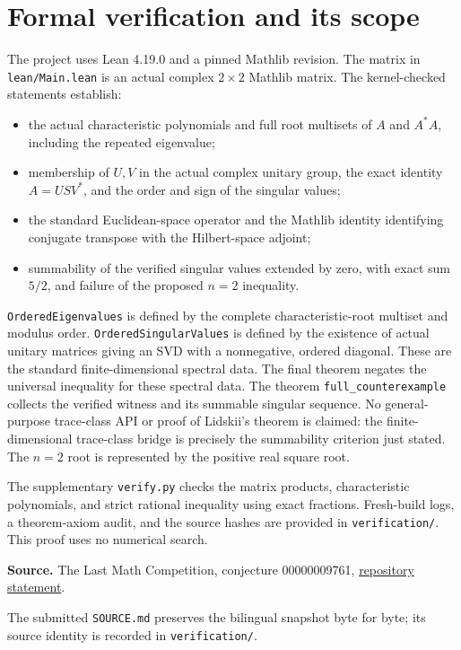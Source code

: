 \documentclass[11pt]{article}
\begin{document}
\section{Formal verification and its scope}
The project uses Lean 4.19.0 and a pinned Mathlib revision. The matrix in
\texttt{lean/Main.lean} is an actual complex $2\times2$ Mathlib matrix.
The kernel-checked statements establish:
\begin{itemize}
\item the actual characteristic polynomials and full root multisets of
$A$ and $A^*A$, including the repeated eigenvalue;
\item membership of $U,V$ in the actual complex unitary group, the exact
identity $A=USV^*$, and the order and sign of the singular values;
\item the standard Euclidean-space operator and the Mathlib identity
identifying conjugate transpose with the Hilbert-space adjoint;
\item summability of the verified singular values extended by zero, with
exact sum $5/2$, and failure of the proposed $n=2$ inequality.
\end{itemize}
\texttt{OrderedEigenvalues} is defined by the complete characteristic-root
multiset and modulus order. \texttt{OrderedSingularValues} is defined by the
existence of actual unitary matrices giving an SVD with a nonnegative,
ordered diagonal. These are the standard finite-dimensional spectral data.
The final theorem negates the universal inequality for these spectral data.
The theorem
\texttt{full\_counterexample} collects the verified witness and its summable
singular sequence. No general-purpose trace-class API or proof of Lidskii's
theorem is claimed: the finite-dimensional trace-class bridge is precisely
the summability criterion just stated. The $n=2$ root is represented by the
positive real square root.

The supplementary \texttt{verify.py} checks the matrix products,
characteristic polynomials, and strict rational inequality using exact
fractions. Fresh-build logs, a theorem-axiom audit, and the source hashes are
provided in \texttt{verification/}. This proof uses no numerical search.

\small
\textbf{Source.} The Last Math Competition, conjecture 00000009761,
\href{https://github.com/The-Last-Math-Competition/The-Last-Math-Competition/blob/main/conjectures/00000009761.md}{repository statement}.

The submitted \texttt{SOURCE.md} preserves the bilingual snapshot byte for
byte; its source identity is recorded in \texttt{verification/}.
\end{document}
